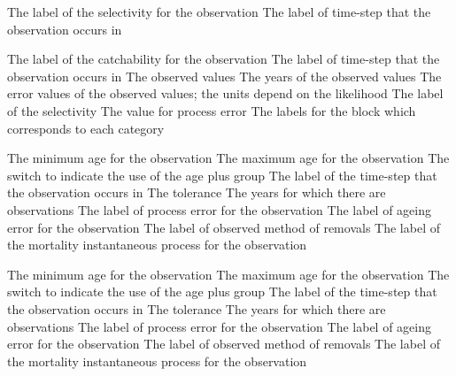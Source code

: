 \par\textbf{}\par
{} {The label of the selectivity for the observation}
 {The label of time-step that the observation occurs in}

\par\textbf{}\par
{} {The label of the catchability for the observation}
 {The label of time-step that the observation occurs in}
 {The observed values}
 {The years of the observed values}
 {The error values of the observed values; the units depend on the likelihood}
 {The label of the selectivity}
 {The value for process error}
 {The labels for the  block which corresponds to each category}

\par\textbf{}\par
{} {The minimum age for the observation}
 {The maximum age for the observation}
 {The switch to indicate the use of the age plus group}
 {The label of the time-step that the observation occurs in}
 {The tolerance}
 {The years for which there are observations}
 {The label of process error for the observation}
 {The label of ageing error for the observation}
 {The label of observed method of removals}
 {The label of the mortality instantaneous process for the observation}

\par\textbf{}\par
{} {The minimum age for the observation}
 {The maximum age for the observation}
 {The switch to indicate the use of the age plus group}
 {The label of the time-step that the observation occurs in}
 {The tolerance}
 {The years for which there are observations}
 {The label of process error for the observation}
 {The label of ageing error for the observation}
 {The label of observed method of removals}
 {The label of the mortality instantaneous process for the observation}

